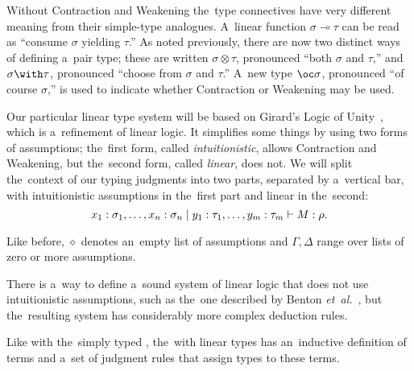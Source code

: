 Without Contraction and Weakening the~type connectives have very different
meaning from their simple-type analogues. A~linear function $\sigma \multimap
\tau$ can be read as ``consume $\sigma$ yielding $\tau$.'' As noted previously,
there are now two distinct ways of defining a~pair type; these are written
$\sigma \otimes \tau$, pronounced ``both $\sigma$ and $\tau$,'' and $\sigma
\with \tau$, pronounced ``choose from $\sigma$ and $\tau$.'' A~new type
$\oc \sigma$, pronounced ``of course $\sigma$,'' is used to indicate whether
Contraction or Weakening may be used.


Our particular linear type system will be based on Girard's Logic of
Unity~\cite{girard_1993}, which is a~refinement of linear logic. It simplifies
some things by using two forms of assumptions; the~first form, called
\emph{intuitionistic}, allows Contraction and Weakening, but the~second form,
called \emph{linear}, does not. We will split the~context of our typing
judgments into two parts, separated by a~vertical bar, with intuitionistic
assumptions in the~first part and linear in the~second:
\[
  x_1 \stackrel{}: \sigma_1, \dotsc, x_n \stackrel{}: \sigma_n \mid y_1 \stackrel{}: \tau_1, \dotsc,
    y_m \stackrel{}: \tau_m \vdash M \stackrel{}: \rho.
\]

Like before, $\diamond$ denotes an~empty list of assumptions and $\Gamma,
\Delta$ range over lists of zero or more assumptions.

There is a~way to define a~sound system of linear logic that does not use
intuitionistic assumptions, such as the~one described by Benton
\textit{et~al.}~\cite{benton_et_al_1993}, but the~resulting system has
considerably more complex deduction rules.

Like with the~simply typed \lc, the~\lc with linear types has an~inductive
definition of terms and a~set of judgment rules that assign types to these
terms.

